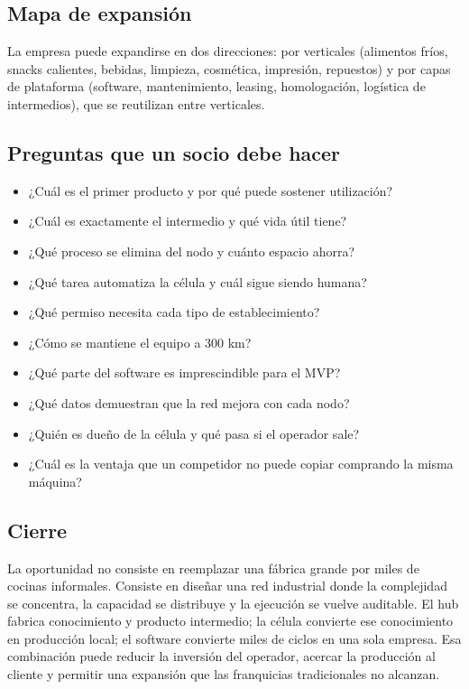 \documentclass[11pt,a4paper]{article}
\begin{document}
\subsection{Mapa de expansión}
La empresa puede expandirse en dos direcciones: por verticales (alimentos fríos, snacks calientes,
bebidas, limpieza, cosmética, impresión, repuestos) y por capas de plataforma (software, mantenimiento,
leasing, homologación, logística de intermedios), que se reutilizan entre verticales.

\subsection{Preguntas que un socio debe hacer}
\begin{itemize}
\item ¿Cuál es el primer producto y por qué puede sostener utilización?
\item ¿Cuál es exactamente el intermedio y qué vida útil tiene?
\item ¿Qué proceso se elimina del nodo y cuánto espacio ahorra?
\item ¿Qué tarea automatiza la célula y cuál sigue siendo humana?
\item ¿Qué permiso necesita cada tipo de establecimiento?
\item ¿Cómo se mantiene el equipo a 300 km?
\item ¿Qué parte del software es imprescindible para el MVP?
\item ¿Qué datos demuestran que la red mejora con cada nodo?
\item ¿Quién es dueño de la célula y qué pasa si el operador sale?
\item ¿Cuál es la ventaja que un competidor no puede copiar comprando la misma máquina?
\end{itemize}

\subsection{Cierre}
La oportunidad no consiste en reemplazar una fábrica grande por miles de cocinas informales. Consiste en
diseñar una red industrial donde la complejidad se concentra, la capacidad se distribuye y la ejecución
se vuelve auditable. El hub fabrica conocimiento y producto intermedio; la célula convierte ese
conocimiento en producción local; el software convierte miles de ciclos en una sola empresa. Esa
combinación puede reducir la inversión del operador, acercar la producción al cliente y permitir una
expansión que las franquicias tradicionales no alcanzan.
\end{document}
